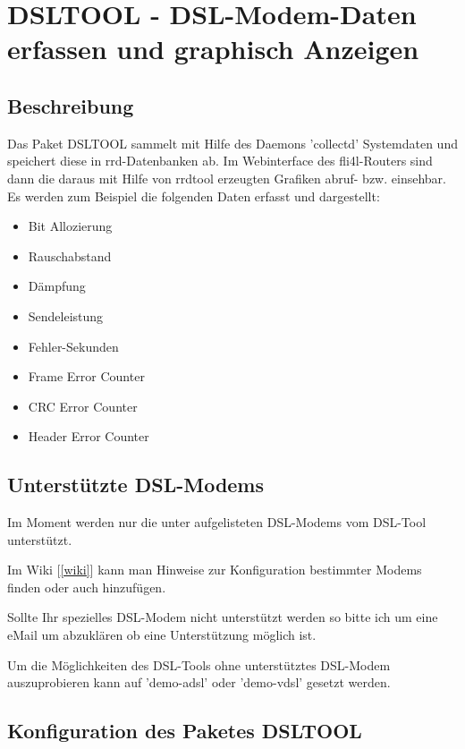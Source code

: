 \section {DSLTOOL - DSL-Modem-Daten erfassen und graphisch Anzeigen}

\subsection {Beschreibung}
Das Paket DSLTOOL sammelt mit Hilfe des Daemons 'collectd' Systemdaten und
speichert diese in rrd-Datenbanken ab.
Im Webinterface des fli4l-Routers sind dann die daraus mit Hilfe von rrdtool
erzeugten Grafiken abruf- bzw. einsehbar.
\\
Es werden zum Beispiel die folgenden Daten erfasst und dargestellt:
\begin{itemize}
  \item Bit Allozierung
  \item Rauschabstand
  \item Dämpfung
  \item Sendeleistung
  \item Fehler-Sekunden
  \item Frame Error Counter
  \item CRC Error Counter
  \item Header Error Counter
\end{itemize}

\subsection {Unterstützte DSL-Modems}

  Im Moment werden nur die unter 
  {} aufgelisteten DSL-Modems vom DSL-Tool unterstützt.
  
  Im Wiki {[\ref{wiki}]} kann man Hinweise zur Konfiguration bestimmter Modems
  finden oder auch hinzufügen.

  Sollte Ihr spezielles DSL-Modem nicht unterstützt werden so bitte ich um eine
  eMail um abzuklären ob eine Unterstützung möglich ist.

  Um die Möglichkeiten des DSL-Tools ohne unterstütztes DSL-Modem auszuprobieren
  kann  auf 'demo-adsl' oder
  'demo-vdsl' gesetzt werden.

\subsection {Konfiguration des Paketes DSLTOOL}

